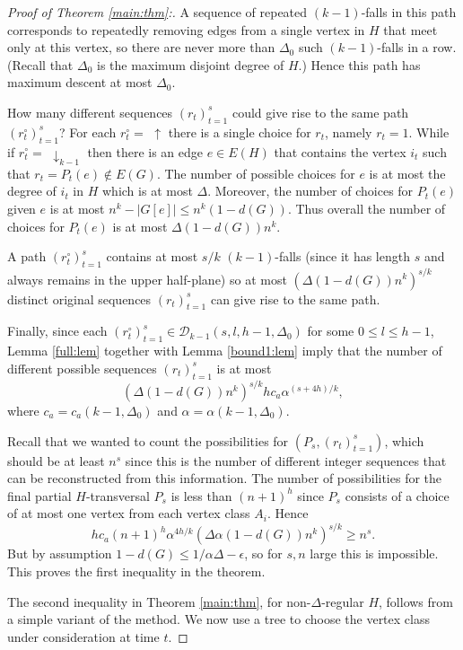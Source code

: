 \documentclass[12]{article}
\def\disj{0}
\def\dycku{\uparrow}
\def\dyckk{\downarrow_{k-1}}
\begin{document}
\begin{proof}[Proof of Theorem \ref{main:thm}:]
A sequence of repeated $(k-1)$-falls in this path corresponds to repeatedly removing edges from a single vertex in $H$ that meet only at this vertex, so there are never more than $\Delta_\disj$ such $(k-1)$-falls in a row. (Recall that $\Delta_\disj$ is the maximum disjoint degree of $H$.) Hence this path has maximum descent at most $\Delta_\disj $.



How many different sequences $(r_t)_{t=1}^s$ could give rise to the same path $(r_t^\circ)_{t=1}^s$? For each $r_t^\circ=\,\,\dycku$ there is a single choice for $r_t$, namely $r_t=1$. While if $r_t^\circ=\,\,\dyckk$ then there is an edge $e\in E(H)$ that contains the vertex $i_t$ such that $r_t=P_t(e)\not\in E(G)$. The number of possible choices for $e$ is at most the degree of $i_t$ in $H$ which is at most $\Delta$. Moreover, the number of choices for $P_t(e)$ given $e$ is at most $n^k-|G[e]|\leq n^k(1-d(G))$. Thus overall the number of choices for $P_t(e)$ is at most $\Delta(1-d(G))n^k$.


A path $(r_t^\circ)_{t=1}^s$ contains at most $s/k$ $(k-1)$-falls (since it has length $s$ and always remains in the upper half-plane) so at most $(\Delta(1-d(G))n^k)^{s/k}$ distinct original sequences $(r_t)_{t=1}^s$ can give rise to the same path.


Finally, since each $(r_t^\circ)_{t=1}^s\in\mathcal{D}_{k-1}(s,l,h-1,\Delta_0)$ for some $0\leq l\leq h-1$, Lemma \ref{full:lem} together with Lemma \ref{bound1:lem} imply that the number of different possible sequences $(r_t)_{t=1}^s$ is at most
\[
(\Delta(1-d(G))n^k)^{s/k}hc_{a}\alpha^{(s+4h)/k},\]
where $c_{a}=c_{a}(k-1,\Delta_0)$ and $\alpha=\alpha(k-1,\Delta_0)$.

Recall that we wanted to count the possibilities for $(P_s,(r_t)_{t=1}^s)$, which should be at least $n^s$ since this is the number of different integer sequences that can be reconstructed from this information. The number of possibilities for the final partial $H$-transversal $P_s$ is less than $(n+1)^h$ since $P_s$ consists of a choice of at most one vertex from each vertex class $A_i$.
Hence
\[
 hc_{a}(n+1)^h\alpha^{4h/k}(\Delta\alpha(1-d(G))n^k)^{s/k}\geq n^s.\]
But by assumption $1-d(G)\leq 1/\alpha\Delta-\epsilon$, so for $s,n$ large this is impossible. This proves the first inequality in the theorem.
 
The second inequality in Theorem \ref{main:thm}, for non-$\Delta$-regular $H$, follows from a simple variant of the method. We now use a tree to choose the vertex class under consideration at time $t$.


\end{proof}
\end{document}
